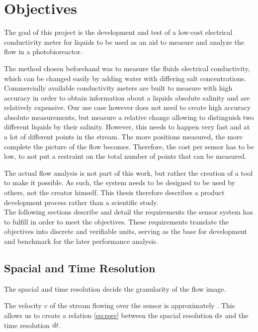 \chapter{Objectives}

The goal of this project is the development and test of a low-cost electrical conductivity meter for liquids to be used as an aid to measure and analyze the flow in a photobioreactor.

The method chosen beforehand was to measure the fluids electrical conductivity, which can be changed easily by adding water with differing salt concentrations. Commercially available conductivity meters are built to measure with high accuracy in order to obtain information about a liquids absolute salinity and are relatively expensive. Our use case however does not need to create high accuracy absolute measurements, but measure a relative change allowing to distinguish two different liquids by their salinity. However, this needs to happen very fast and at a lot of different points in the stream. The more positions measured, the more complete the picture of the flow becomes. Therefore, the cost per sensor has to be low, to not put a restraint on the total number of points that can be measured.

The actual flow analysis is not part of this work, but rather the creation of a tool to make it possible. As such, the system needs to be designed to be used by others, not the creator himself. This thesis therefore describes a product development process rather than a scientific study. \\

The following sections describe and detail the requirements the sensor system has to fulfill in order to meet the objectives. These requirements translate the objectives into discrete and verifiable units, serving as the base for development and benchmark for the later performance analysis. 

\section{Spacial and Time Resolution}

The spacial and time resolution decide the granularity of the flow image.

The velocity $ v $ of the stream flowing over the sensor is approximately . This allows us to create a relation \eqref{eq:resv} between the spacial resolution $ \mathop{}\!\mathrm{d} s $ and the time resolution $ \mathop{}\!\mathrm{d} t $.

